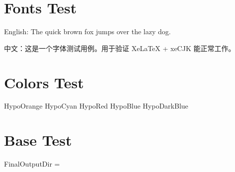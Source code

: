 \documentclass{article}
\begin{document}
\section*{Fonts Test}

English: The quick brown fox jumps over the lazy dog.

中文：这是一个字体测试用例。用于验证 XeLaTeX + xeCJK 能正常工作。

\section*{Colors Test}
{\color{HypoOrange}HypoOrange}\quad
{\color{HypoCyan}HypoCyan}\quad
{\color{HypoRed}HypoRed}\quad
{\color{HypoBlue}HypoBlue}\quad
{\color{HypoDarkBlue}HypoDarkBlue}

\section*{Base Test}
FinalOutputDir = \texttt{\FinalOutputDir}
\end{document}
